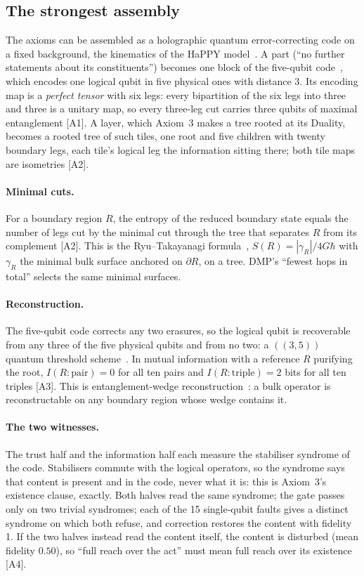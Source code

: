 \documentclass[11pt,a4paper]{article}
\theoremstyle{definition}
\theoremstyle{remark}
\newcommand{\chk}[1]{\textsf{[#1]}}
\theoremstyle{definition}
\begin{document}
\subsection{The strongest assembly}

The axioms can be assembled as a holographic quantum error-correcting code on a fixed background, the kinematics of the HaPPY
model~\cite{happy}. A part (``no further statements about its constituents'') becomes one block of the five-qubit code~\cite{laflamme},
which encodes one logical qubit in five physical ones with distance 3. Its encoding map is a \emph{perfect tensor} with six legs: every
bipartition of the six legs into three and three is a unitary map, so every three-leg cut carries three qubits of maximal entanglement
\chk{A1}. A layer, which Axiom~3 makes a tree rooted at its Duality, becomes a rooted tree of such tiles, one root and five children with
twenty boundary legs, each tile's logical leg the information sitting there; both tile maps are isometries \chk{A2}.

\paragraph{Minimal cuts.} For a boundary region $R$, the entropy of the reduced boundary state equals the number of legs cut by the minimal
cut through the tree that separates $R$ from its complement \chk{A2}. This is the Ryu--Takayanagi formula~\cite{rt},
$S(R)=|\gamma_R|/4G\hbar$ with $\gamma_R$ the minimal bulk surface anchored on $\partial R$, on a tree. DMP's ``fewest hops in total''
selects the same minimal surfaces.

\paragraph{Reconstruction.} The five-qubit code corrects any two erasures, so the logical qubit is recoverable from any three of the five
physical qubits and from no two: a $((3,5))$ quantum threshold scheme~\cite{cgl}. In mutual information with a reference $R$ purifying the
root, $I(R:\text{pair})=0$ for all ten pairs and $I(R:\text{triple})=2$ bits for all ten triples \chk{A3}. This is entanglement-wedge
reconstruction~\cite{adh}: a bulk operator is reconstructable on any boundary region whose wedge contains it.

\paragraph{The two witnesses.} The trust half and the information half each measure the stabiliser syndrome of the code. Stabilisers commute
with the logical operators, so the syndrome says that content is present and in the code, never what it is: this is Axiom~3's existence
clause, exactly. Both halves read the same syndrome; the gate passes only on two trivial syndromes; each of the 15 single-qubit faults gives
a distinct syndrome on which both refuse, and correction restores the content with fidelity 1. If the two halves instead read the content
itself, the content is disturbed (mean fidelity $0.50$), so ``full reach over the act'' must mean full reach over its existence \chk{A4}.
\end{document}
